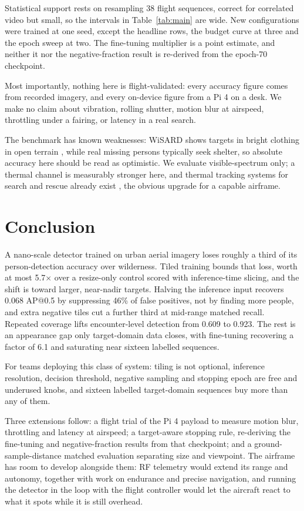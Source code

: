 \documentclass[conference]{IEEEtran}
\begin{document}
Statistical support rests on resampling 38 flight sequences, correct for
correlated video but small, so the intervals in Table~\ref{tab:main} are wide.
New configurations were trained at one seed, except the headline rows, the
budget curve at three and the epoch sweep at two. The fine-tuning multiplier is
a point estimate, and neither it nor the negative-fraction result is re-derived
from the epoch-70 checkpoint.

Most importantly, nothing here is flight-validated: every accuracy figure comes
from recorded imagery, and every on-device figure from a Pi 4 on a desk. We make
no claim about vibration, rolling shutter, motion blur at airspeed, throttling
under a fairing, or latency in a real search.

The benchmark has known weaknesses: WiSARD shows targets in bright clothing in
open terrain \cite{manzini2023}, while real missing persons typically seek
shelter, so absolute accuracy here should be read as optimistic. We evaluate
visible-spectrum only; a thermal channel is measurably stronger here, and
thermal tracking systems for search and rescue already exist
\cite{yeom2024a,yeom2024b}, the obvious upgrade for a capable airframe.

\section{Conclusion}
\label{sec:conclusion}

A nano-scale detector trained on urban aerial imagery loses roughly a third of
its person-detection accuracy over wilderness. Tiled training bounds that loss,
worth at most 5.7$\times$ over a resize-only control scored with inference-time
slicing, and the shift is toward larger, near-nadir targets. Halving the
inference input recovers 0.068 AP@0.5 by suppressing 46\% of false positives,
not by finding more people, and extra negative tiles cut a further third at
mid-range matched recall. Repeated coverage lifts encounter-level detection from
0.609 to 0.923. The rest is an appearance gap only target-domain data closes,
with fine-tuning recovering a factor of 6.1 and saturating near sixteen labelled
sequences.

For teams deploying this class of system: tiling is not optional, inference
resolution, decision threshold, negative sampling and stopping epoch are free
and underused knobs, and sixteen labelled target-domain sequences buy more than
any of them.

Three extensions follow: a flight trial of the Pi 4 payload to measure motion
blur, throttling and latency at airspeed; a target-aware stopping rule,
re-deriving the fine-tuning and negative-fraction results from that checkpoint;
and a ground-sample-distance matched evaluation separating size and viewpoint.
The airframe has room to develop alongside them: RF telemetry would extend its
range and autonomy, together with work on endurance and precise navigation, and
running the detector in the loop with the flight controller would let the
aircraft react to what it spots while it is still overhead.
\end{document}
